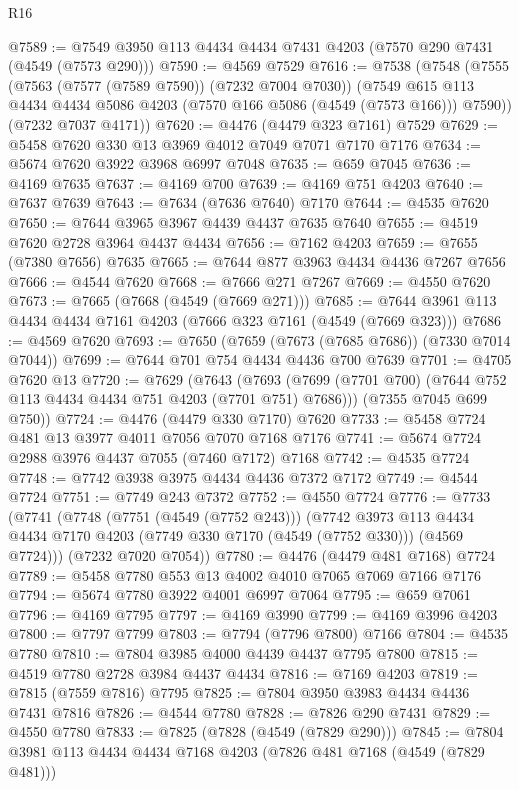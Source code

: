 \begin{lexlean}{R16}
\begin{coremodule}
@7589 := @7549 @3950 @113 @4434 @4434 @7431 @4203 (@7570 @290 @7431 (@4549 (@7573 @290)))
@7590 := @4569 @7529
@7616 := @7538
    (@7548
      (@7555
        (@7563 (@7577 (@7589 @7590)) (@7232 @7004 @7030))
        (@7549 @615 @113 @4434 @4434 @5086 @4203 (@7570 @166 @5086 (@4549 (@7573 @166))) @7590))
      (@7232 @7037 @4171))
@7620 := @4476 (@4479 @323 @7161) @7529
@7629 := @5458 @7620 @330 @13 @3969 @4012 @7049 @7071 @7170 @7176
@7634 := @5674 @7620 @3922 @3968 @6997 @7048
@7635 := @659 @7045
@7636 := @4169 @7635
@7637 := @4169 @700
@7639 := @4169 @751 @4203
@7640 := @7637 @7639
@7643 := @7634 (@7636 @7640) @7170
@7644 := @4535 @7620
@7650 := @7644 @3965 @3967 @4439 @4437 @7635 @7640
@7655 := @4519 @7620 @2728 @3964 @4437 @4434
@7656 := @7162 @4203
@7659 := @7655 (@7380 @7656) @7635
@7665 := @7644 @877 @3963 @4434 @4436 @7267 @7656
@7666 := @4544 @7620
@7668 := @7666 @271 @7267
@7669 := @4550 @7620
@7673 := @7665 (@7668 (@4549 (@7669 @271)))
@7685 := @7644 @3961 @113 @4434 @4434 @7161 @4203 (@7666 @323 @7161 (@4549 (@7669 @323)))
@7686 := @4569 @7620
@7693 := @7650 (@7659 (@7673 (@7685 @7686)) (@7330 @7014 @7044))
@7699 := @7644 @701 @754 @4434 @4436 @700 @7639
@7701 := @4705 @7620 @13
@7720 := @7629
    (@7643
      (@7693 (@7699 (@7701 @700) (@7644 @752 @113 @4434 @4434 @751 @4203 (@7701 @751) @7686)))
      (@7355 @7045 @699 @750))
@7724 := @4476 (@4479 @330 @7170) @7620
@7733 := @5458 @7724 @481 @13 @3977 @4011 @7056 @7070 @7168 @7176
@7741 := @5674 @7724 @2988 @3976 @4437 @7055 (@7460 @7172) @7168
@7742 := @4535 @7724
@7748 := @7742 @3938 @3975 @4434 @4436 @7372 @7172
@7749 := @4544 @7724
@7751 := @7749 @243 @7372
@7752 := @4550 @7724
@7776 := @7733
    (@7741
      (@7748
        (@7751 (@4549 (@7752 @243)))
        (@7742
          @3973
          @113
          @4434
          @4434
          @7170
          @4203
          (@7749 @330 @7170 (@4549 (@7752 @330)))
          (@4569 @7724)))
      (@7232 @7020 @7054))
@7780 := @4476 (@4479 @481 @7168) @7724
@7789 := @5458 @7780 @553 @13 @4002 @4010 @7065 @7069 @7166 @7176
@7794 := @5674 @7780 @3922 @4001 @6997 @7064
@7795 := @659 @7061
@7796 := @4169 @7795
@7797 := @4169 @3990
@7799 := @4169 @3996 @4203
@7800 := @7797 @7799
@7803 := @7794 (@7796 @7800) @7166
@7804 := @4535 @7780
@7810 := @7804 @3985 @4000 @4439 @4437 @7795 @7800
@7815 := @4519 @7780 @2728 @3984 @4437 @4434
@7816 := @7169 @4203
@7819 := @7815 (@7559 @7816) @7795
@7825 := @7804 @3950 @3983 @4434 @4436 @7431 @7816
@7826 := @4544 @7780
@7828 := @7826 @290 @7431
@7829 := @4550 @7780
@7833 := @7825 (@7828 (@4549 (@7829 @290)))
@7845 := @7804 @3981 @113 @4434 @4434 @7168 @4203 (@7826 @481 @7168 (@4549 (@7829 @481)))

\end{coremodule}
\end{lexlean}
